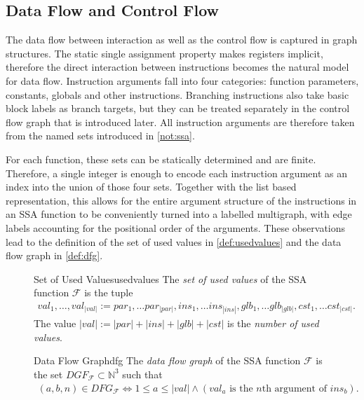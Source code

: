 \subsection{Data Flow and Control Flow}

    The data flow between interaction as well as the control flow is captured in
    graph structures.
    The static single assignment property makes registers implicit, therefore
    the direct interaction between instructions becomes the natural model for
    data flow.
    Instruction arguments fall into four categories: function parameters,
    constants, globals and other instructions.
    Branching instructions also take basic block labels as branch targets,
    but they can be treated separately in the control flow graph that is
    introduced later.
    All instruction arguments are therefore taken from the named sets introduced
    in \autoref{not:ssa}.

    For each function, these sets can be statically determined and are finite.
    Therefore, a single integer is enough to encode each instruction argument as
    an index into the union of those four sets.
    Together with the list based representation, this allows for the
    entire argument structure of the instructions in an SSA function to be
    conveniently turned into a labelled multigraph, with edge labels accounting
    for the positional order of the arguments.
    These observations lead to the definition of the set of used values in
    \autoref{def:usedvalues} and the data flow graph in \autoref{def:dfg}.

\begin{figure}[h]
\begin{definition}{Set of Used Values}{usedvalues}
    The {\em set of used values} of the SSA function $\mathcal F$ is the tuple
    \begin{align*}
       val_1,\dots,val_{|val|} := par_1,\dots par_{|par|},
                                  ins_1,\dots ins_{|ins|},
                                  glb_1,\dots glb_{|glb|},
                                  cst_1,\dots cst_{|cst|}.
    \end{align*}
    The value $|val|:=|par|+|ins|+|glb|+|cst|$ is the
    {\em number of used values}.
\end{definition}

\begin{definition}{Data Flow Graph}{dfg}
    The {\em data flow graph} of the SSA function $\mathcal F$ is the set
    $DGF_{\mathcal F}\subset \mathbb N^3$ such that
    \begin{align*}
        (a,b,n)\in DFG_{\mathcal F}\iff 1\leq a\leq |val|
            \mathrel{\land}(val_a\text{ is the $n$th argument of }ins_b).
    \end{align*}
\end{definition}
\end{figure}

